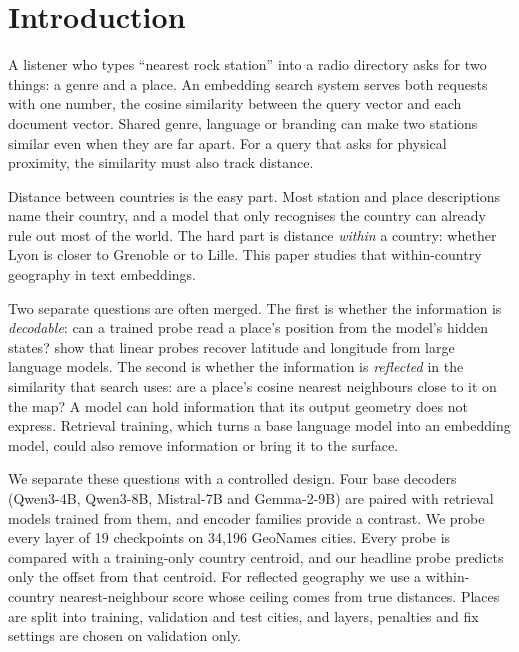 \section{Introduction}
\label{sec:intro}

A listener who types ``nearest rock station'' into a radio directory asks for two things: a genre and a place. An embedding search system serves both requests with one number, the cosine similarity between the query vector and each document vector. Shared genre, language or branding can make two stations similar even when they are far apart. For a query that asks for physical proximity, the similarity must also track distance.

Distance between countries is the easy part. Most station and place descriptions name their country, and a model that only recognises the country can already rule out most of the world. The hard part is distance \emph{within} a country: whether Lyon is closer to Grenoble or to Lille. This paper studies that within-country geography in text embeddings.

Two separate questions are often merged. The first is whether the information is \emph{decodable}: can a trained probe read a place's position from the model's hidden states? \citet{gurnee2024space} show that linear probes recover latitude and longitude from large language models. The second is whether the information is \emph{reflected} in the similarity that search uses: are a place's cosine nearest neighbours close to it on the map? A model can hold information that its output geometry does not express. Retrieval training, which turns a base language model into an embedding model, could also remove information or bring it to the surface.

We separate these questions with a controlled design. Four base decoders (Qwen3-4B, Qwen3-8B, Mistral-7B and Gemma-2-9B) are paired with retrieval models trained from them, and encoder families provide a contrast. We probe every layer of 19 checkpoints on 34,196 GeoNames cities. Every probe is compared with a training-only country centroid, and our headline probe predicts only the offset from that centroid. For reflected geography we use a within-country nearest-neighbour score whose ceiling comes from true distances. Places are split into training, validation and test cities, and layers, penalties and fix settings are chosen on validation only.

